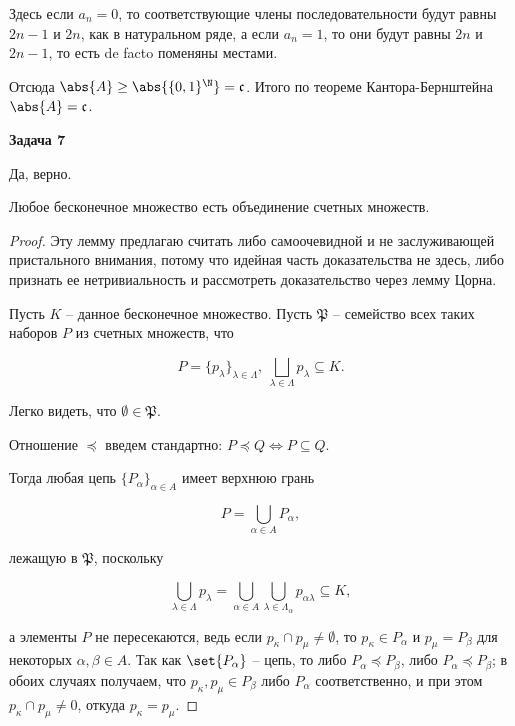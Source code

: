 		Здесь если $a_n = 0$, то соответствующие члены последовательности будут равны $2n-1$ и $2n$, как в натуральном ряде, а если $a_n = 1$, то они будут равны $2n$ и $2n-1$, то есть de facto поменяны местами.

		Отсюда $\abs{A} \ge \abs{\{0, 1\}^{\N}} = \mathfrak{c}$. Итого по теореме Кантора-Бернштейна $\abs{A} = \mathfrak{c}$.


	\begin{center}
    \textbf{Задача 7}
\end{center}
		Да, верно.

		\begin{lemma}
			Любое бесконечное множество есть объединение счетных множеств.
		\end{lemma}

		\begin{proof}
			Эту лемму предлагаю считать либо самоочевидной и не заслуживающей пристального внимания, потому что идейная часть доказательства не здесь, либо признать ее нетривиальность и рассмотреть доказательство через лемму Цорна.

			Пусть $K$ -- данное бесконечное множество. Пусть $\mathfrak{P}$ -- семейство всех таких наборов $P$ из счетных множеств, что

			\begin{equation*}
				P = \{p_\lambda\}_{\lambda \in \Lambda}, \ \bigsqcup_{\lambda \in \Lambda} p_\lambda \subseteq K.
			\end{equation*}

			Легко видеть, что $\emptyset \in \mathfrak{P}$.

			Отношение $\preceq$ введем стандартно: $P \preceq Q \Longleftrightarrow P \subseteq Q$.

			Тогда любая цепь $\{P_\alpha\}_{\alpha \in A}$ имеет верхнюю грань

			\begin{equation*}
				P = \bigcup_{\alpha \in A} P_\alpha,
			\end{equation*}

			лежащую в $\mathfrak{P}$, поскольку

			\begin{equation*}
				\bigcup_{\lambda \in \Lambda} p_\lambda = \bigcup_{\alpha \in A} \bigcup_{\lambda \in \Lambda_\alpha} p_{\alpha \lambda} \subseteq K,
			\end{equation*}

			а элементы $P$ не пересекаются, ведь если $p_\kappa \cap p_\mu \ne \emptyset$, то $p_\kappa \in P_\alpha$ и $p_\mu = P_\beta$ для некоторых $\alpha, \beta \in A$. Так как $\set{P_\alpha}$ -- цепь, то либо $P_\alpha \preceq P_\beta$, либо $P_\alpha \preceq P_\beta$; в обоих случаях получаем, что $p_\kappa, p_\mu \in P_\beta$ либо $P_\alpha$ соответственно, и при этом $p_\kappa \cap p_\mu \ne 0$, откуда $p_\kappa = p_\mu$.


\end{proof}
